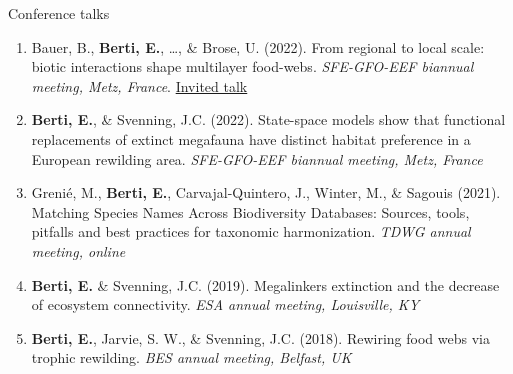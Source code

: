 \documentclass{resume} %
\begin{document}
\begin{rSection}{Conference talks}
\begin{enumerate}[leftmargin=0pt]
    \setcounter{enumi}{0}
    \itemsep-1ex
    \item{Bauer, B., \textbf{Berti, E.}, \dots, \& Brose, U. (2022). From regional to local scale: biotic interactions shape multilayer food-webs. \textit{SFE-GFO-EEF biannual meeting, Metz, France}. \underline{Invited talk}}
    \item{\textbf{Berti, E.}, \& Svenning, J.C. (2022). State-space models show that functional replacements of extinct megafauna have distinct habitat preference in a European rewilding area. \textit{SFE-GFO-EEF biannual meeting, Metz, France}}
    \item{Grenié, M., \textbf{Berti, E.}, Carvajal-Quintero, J., Winter, M., \& Sagouis (2021). Matching Species Names Across Biodiversity Databases: Sources, tools, pitfalls and best practices for taxonomic harmonization. \textit{TDWG annual meeting, online}}
    \item{\textbf{Berti, E.} \& Svenning, J.C. (2019). Megalinkers extinction and the decrease of ecosystem connectivity. \textit{ESA annual meeting, Louisville, KY}}
    \item{\textbf{Berti, E.}, Jarvie, S. W., \& Svenning, J.C. (2018). Rewiring food webs via trophic rewilding. \textit{BES annual meeting, Belfast, UK}}
\end{enumerate}
\end{rSection}


\end{document}
